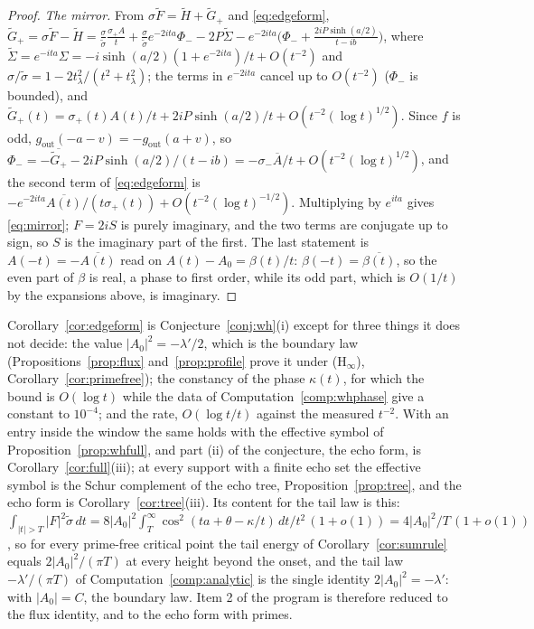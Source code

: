 \documentclass[11pt]{article}
\theoremstyle{definition}
\theoremstyle{remark}
\begin{document}
\begin{proof}
\emph{The mirror.} From $\sigma\tilde F=\tilde H+\tilde G_+$ and \eqref{eq:edgeform}, $\tilde G_+=\sigma\tilde F-\tilde H=\frac{\sigma}{\tilde\sigma}\frac{\sigma_+A}t+\frac\sigma{\tilde\sigma}e^{-2ita}\Phi_--2P\tilde\Sigma-e^{-2ita}\big(\Phi_-+\tfrac{2iP\sinh(a/2)}{t-ib}\big)$, where $\tilde\Sigma=e^{-ita}\Sigma=-i\sinh(a/2)(1+e^{-2ita})/t+O(t^{-2})$ and $\sigma/\tilde\sigma=1-2t_\lambda^2/(t^2+t_\lambda^2)$; the terms in $e^{-2ita}$ cancel up to $O(t^{-2})$ ($\Phi_-$ is bounded), and $\tilde G_+(t)=\sigma_+(t)A(t)/t+2iP\sinh(a/2)/t+O(t^{-2}(\log t)^{1/2})$. Since $f$ is odd, $g_{\mathrm{out}}(-a-v)=-g_{\mathrm{out}}(a+v)$, so $\Phi_-=-\overline{\tilde G_+}-2iP\sinh(a/2)/(t-ib)=-\sigma_-\overline A/t+O(t^{-2}(\log t)^{1/2})$, and the second term of \eqref{eq:edgeform} is $-e^{-2ita}\overline{A(t)}/(t\sigma_+(t))+O(t^{-2}(\log t)^{-1/2})$. Multiplying by $e^{ita}$ gives \eqref{eq:mirror}; $F=2iS$ is purely imaginary, and the two terms are conjugate up to sign, so $S$ is the imaginary part of the first. The last statement is $A(-t)=-\overline{A(t)}$ read on $A(t)-A_0=\beta(t)/t$: $\beta(-t)=\overline{\beta(t)}$, so the even part of $\beta$ is real, a phase to first order, while its odd part, which is $O(1/t)$ by the expansions above, is imaginary.
\end{proof}

Corollary~\ref{cor:edgeform} is Conjecture~\ref{conj:wh}(i) except for three things it does not decide: the value $|A_0|^2=-\lambda'/2$, which is the boundary law (Propositions~\ref{prop:flux} and~\ref{prop:profile} prove it under (H$_\infty$), Corollary~\ref{cor:primefree}); the constancy of the phase $\kappa(t)$, for which the bound is $O(\log t)$ while the data of Computation~\ref{comp:whphase} give a constant to $10^{-4}$; and the rate, $O(\log t/t)$ against the measured $t^{-2}$. With an entry inside the window the same holds with the effective symbol of Proposition~\ref{prop:whfull}, and part (ii) of the conjecture, the echo form, is Corollary~\ref{cor:full}(iii); at every support with a finite echo set the effective symbol is the Schur complement of the echo tree, Proposition~\ref{prop:tree}, and the echo form is Corollary~\ref{cor:tree}(iii). Its content for the tail law is this: $\int_{|t|>T}|F|^2\tilde\sigma\,dt=8|A_0|^2\int_T^\infty\cos^2(ta+\theta-\kappa/t)\,dt/t^2\,(1+o(1))=4|A_0|^2/T\,(1+o(1))$, so for every prime-free critical point the tail energy of Corollary~\ref{cor:sumrule} equals $2|A_0|^2/(\pi T)$ at every height beyond the onset, and the tail law $-\lambda'/(\pi T)$ of Computation~\ref{comp:analytic} is the single identity $2|A_0|^2=-\lambda'$: with $|A_0|=C$, the boundary law. Item 2 of the program is therefore reduced to the flux identity, and to the echo form with primes.
\end{document}
